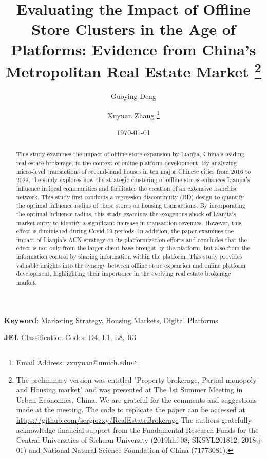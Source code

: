 \documentclass[12pt]{article}
\title{ \vspace*{-2.5cm} \hspace*{-0.5cm}Evaluating the Impact of Offline Store Clusters in the Age of Platforms: Evidence from China's Metropolitan Real Estate Market \footnote{
The preliminary version was entitled "Property brokerage, Partial monopoly and Housing market" and was presented at The 1st Summer Meeting in Urban Economics, China. We are grateful for the comments and suggestions made at the meeting. The code to replicate the paper can be accessed at \href{https://github.com/sergiozxy/RealEstateBrokerage}{https://github.com/sergiozxy/RealEstateBrokerage} The authors gratefully acknowledge financial support from the Fundamental Research Funds for the Central Universities of Sichuan University (2019hhf-08; SKSYL201812; 2018jj-01) and National Natural Science Foundation of China (71773081). %
}}
\date{ \vspace*{0.5cm} \today}
\begin{document}
\author[1]{Guoying Deng}
\author[2]{Xuyuan Zhang \thanks{Email Address: \href{mailto:zxuyuan@umich.edu}{zxuyuan@umich.edu}}}

\bgroup
\let\footnoterule\relax

\begin{singlespace}
\maketitle

\begin{abstract}
    \noindent This study examines the impact of offline store expansion by Lianjia, China's leading real estate brokerage, in the context of online platform development. By analyzing micro-level transactions of second-hand houses in ten major Chinese cities from 2016 to 2022, the study explores how the strategic clustering of offline stores enhances Lianjia's influence in local communities and facilitates the creation of an extensive franchise network. This study first conducts a regression discontinuity (RD) design to quantify the optimal influence radius of these stores on housing transactions. By incorporating the optimal influence radius, this study examines the exogenous shock of Lianjia's market entry to identify a significant increase in transaction revenues. However, this effect is diminished during Covid-19 periods. In addition, the paper examines the impact of Lianjia's ACN strategy on its platformization efforts and concludes that the effect is not only from the larger client base brought by the platform, but also from the information control by sharing information within the platform. This study provides valuable insights into the synergy between offline store expansion and online platform development, highlighting their importance in the evolving real estate brokerage market.
  \end{abstract}
  
  \textbf{Keyword}: Marketing Strategy, Housing Markets, Digital Platforms
  
  \textbf{JEL} Classification Codes: D4, L1, L8, R3
\end{singlespace}
\thispagestyle{empty}

\clearpage
\egroup
\setcounter{page}{1}

\end{document}
